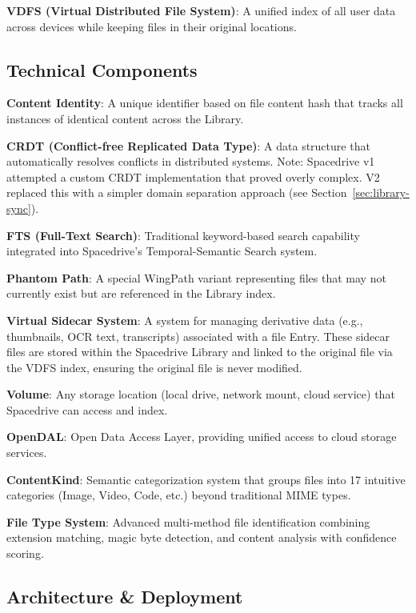 \documentclass[sigconf]{acmart}
\begin{document}
\textbf{VDFS (Virtual Distributed File System)}: A unified index of all user data across devices while keeping files in their original locations.

\subsection*{Technical Components}

\textbf{Content Identity}: A unique identifier based on file content hash that tracks all instances of identical content across the Library.

\textbf{CRDT (Conflict-free Replicated Data Type)}: A data structure that automatically resolves conflicts in distributed systems. Note: Spacedrive v1 attempted a custom CRDT implementation that proved overly complex. V2 replaced this with a simpler domain separation approach (see Section~\ref{sec:library-sync}).

\textbf{FTS (Full-Text Search)}: Traditional keyword-based search capability integrated into Spacedrive's Temporal-Semantic Search system.

\textbf{Phantom Path}: A special WingPath variant representing files that may not currently exist but are referenced in the Library index.

\textbf{Virtual Sidecar System}: A system for managing derivative data (e.g., thumbnails, OCR text, transcripts) associated with a file Entry. These sidecar files are stored within the Spacedrive Library and linked to the original file via the VDFS index, ensuring the original file is never modified.

\textbf{Volume}: Any storage location (local drive, network mount, cloud service) that Spacedrive can access and index.

\textbf{OpenDAL}: Open Data Access Layer, providing unified access to cloud storage services.

\textbf{ContentKind}: Semantic categorization system that groups files into 17 intuitive categories (Image, Video, Code, etc.) beyond traditional MIME types.

\textbf{File Type System}: Advanced multi-method file identification combining extension matching, magic byte detection, and content analysis with confidence scoring.

\subsection*{Architecture \& Deployment}
\end{document}
